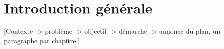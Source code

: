 \chapter*{Introduction générale}
[Contexte -> problème -> objectif -> démarche -> annonce du plan, un paragraphe par chapitre.]
